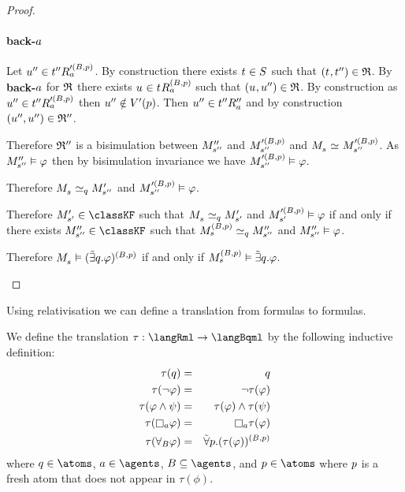 \begin{proof}
\begin{description}
        \paragraph{back-$\agentA$}
        Let $\kStateUPP \in \kSuccessorsA[\prime(\agentsB, \atomP)]{\kStateTPP}$.
        By construction there exists $\kStateT \in \kStates$ such that $(\kStateT, \kStateTPP) \in \bisimulation$.
        By {\bf back-$\agentA$} for $\bisimulation$ there exists $\kStateU \in \kSuccessorsA[(\agentsB, \atomP)]{\kStateT}$ such that $(\kStateU, \kStateUPP) \in \bisimulation$.
        By construction as $\kStateUPP \in \kSuccessorsA[\prime(\agentsB, \atomP)]{\kStateTPP}$ then $\kStateUPP \notin \kValuationP(\atomP)$.
        Then $\kStateUPP \in \kSuccessorsPPA{\kStateTPP}$ and by construction $(\kStateUPP, \kStateUPP) \in \bisimulation''$.

        Therefore $\bisimulation''$ is a bisimulation between $\kPModelPP{\kStateSPP}$ and $\kPModel[\prime(\agentsB, \atomP)]{\kStateSPP}$ and $\kPModel{\kStateS} \bisimilar \kPModel[\prime(\agentsB, \atomP)]{\kStateSPP}$.
        As $\kPModelPP{\kStateSPP} \entails \phi$ then by bisimulation invariance we have $\kPModel[\prime(\agentsB, \atomP)]{\kStateSPP} \entails \phi$.

        Therefore $\kPModel{\kStateS} \bisimilar[\atomQ] \kPModelP{\kStateSPP}$ and $\kPModel[\prime(\agentsB, \atomP)]{\kStateSPP} \entails \phi$.

        Therefore $\kPModelP{\kStateSP} \in \classKF$ such that $\kPModel{\kStateS} \bisimilar[\atomQ] \kPModelP{\kStateSP}$ and $\kPModel[\prime(\agentsB, \atomP)]{\kStateSP} \entails \phi$ if and only if there exists $\kPModelPP{\kStateSPP} \in \classKF$ such that $\kPModel[(\agentsB, \atomP)]{\kStateS} \bisimilar[\atomQ] \kPModelPP{\kStateSPP}$ and $\kPModelPP{\kStateSPP} \entails \phi$.

        Therefore $\kPModel{\kStateS} \entails (\somebisimsQ \phi)^{(\agentsB, \atomP)}$ if and only if $\kPModel[(\agentsB, \atomP)]{\kStateS} \entails \somebisimsQ \phi$.
\end{description}
\end{proof}

Using relativisation we can define a translation from \langRml{} formulas to \langBqml{} formulas.

\begin{definition}
We define the translation $\tau : \langRml \to \langBqml$ by the following inductive definition:
\begin{eqnarray*}
    \tau(\atomQ) &=& \atomQ\\
    \tau(\lnot \phi) &=& \lnot \tau(\phi)\\
    \tau(\phi \land \psi) &=& \tau(\phi) \land \tau(\psi)\\
    \tau(\necessaryA \phi) &=& \necessaryA \tau(\phi)\\
    \tau(\allrefsBs \phi) &=& \allbisimsP (\tau(\phi))^{(\agentsB, \atomP)}
\end{eqnarray*}
where $\atomQ \in \atoms$, $\agentA \in \agents$, $\agentsB \subseteq \agents$, and $\atomP \in \atoms$ where $\atomP$ is a fresh atom that does not appear in $\tau(\phi)$.
\end{definition}

